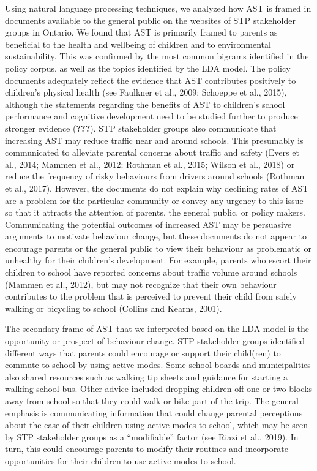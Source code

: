 \documentclass[]{elsarticle} %
\begin{document}
Using natural language processing techniques, we analyzed how AST is
framed in documents available to the general public on the websites of
STP stakeholder groups in Ontario. We found that AST is primarily framed
to parents as beneficial to the health and wellbeing of children and to
environmental sustainability. This was confirmed by the most common
bigrams identified in the policy corpus, as well as the topics
identified by the LDA model. The policy documents adequately reflect the
evidence that AST contributes positively to children's physical health
(see Faulkner et al., 2009; Schoeppe et al., 2015), although the
statements regarding the benefits of AST to children's school
performance and cognitive development need to be studied further to
produce stronger evidence ({\textbf{???}}). STP stakeholder groups also
communicate that increasing AST may reduce traffic near and around
schools. This presumably is communicated to alleviate parental concerns
about traffic and safety (Evers et al., 2014; Mammen et al., 2012;
Rothman et al., 2015; Wilson et al., 2018) or reduce the frequency of
risky behaviours from drivers around schools (Rothman et al., 2017).
However, the documents do not explain why declining rates of AST are a
problem for the particular community or convey any urgency to this issue
so that it attracts the attention of parents, the general public, or
policy makers. Communicating the potential outcomes of increased AST may
be persuasive arguments to motivate behaviour change, but these
documents do not appear to encourage parents or the general public to
view their behaviour as problematic or unhealthy for their children's
development. For example, parents who escort their children to school
have reported concerns about traffic volume around schools (Mammen et
al., 2012), but may not recognize that their own behaviour contributes
to the problem that is perceived to prevent their child from safely
walking or bicycling to school (Collins and Kearns, 2001).

The secondary frame of AST that we interpreted based on the LDA model is
the opportunity or prospect of behaviour change. STP stakeholder groups
identified different ways that parents could encourage or support their
child(ren) to commute to school by using active modes. Some school
boards and municipalities also shared resources such as walking tip
sheets and guidance for starting a walking school bus. Other advice
included dropping children off one or two blocks away from school so
that they could walk or bike part of the trip. The general emphasis is
communicating information that could change parental perceptions about
the ease of their children using active modes to school, which may be
seen by STP stakeholder groups as a ``modifiable'' factor (see Riazi et
al., 2019). In turn, this could encourage parents to modify their
routines and incorporate opportunities for their children to use active
modes to school.
\end{document}
